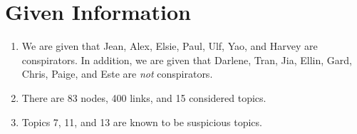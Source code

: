 \documentclass{icmmcm}
\begin{document}
%  

\section{Given Information}
\begin{enumerate}
\item We are given that Jean, Alex, Elsie, Paul, Ulf, Yao,
and Harvey are conspirators. In addition, we are given that Darlene, Tran, Jia, Ellin, Gard, Chris,
Paige, and Este are \textit{not} conspirators.
\label{known_cons}
\item There are 83 nodes, 400 links, and 15 considered topics.\label{number}
\item Topics 7, 11, and 13 are known to be suspicious topics. \label{known_sus_topics}
\end{enumerate}
\end{document}
